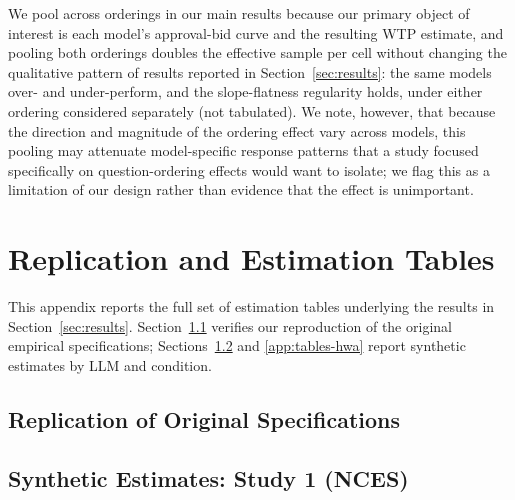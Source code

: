 \documentclass[12pt]{article}
\begin{document}
We pool across orderings in our main results because our primary object of interest is each model's approval-bid curve and the resulting WTP estimate, and pooling both orderings doubles the effective sample per cell without changing the qualitative pattern of results reported in Section~\ref{sec:results}: the same models over- and under-perform, and the slope-flatness regularity holds, under either ordering considered separately (not tabulated). We note, however, that because the direction and magnitude of the ordering effect vary across models, this pooling may attenuate model-specific response patterns that a study focused specifically on question-ordering effects would want to isolate; we flag this as a limitation of our design rather than evidence that the effect is unimportant.

\section{Replication and Estimation Tables}\label{app:tables}

This appendix reports the full set of estimation tables underlying the
results in Section~\ref{sec:results}. Section~\ref{app:replication}
verifies our reproduction of the original empirical specifications;
Sections~\ref{app:tables-nces} and \ref{app:tables-hwa} report synthetic
estimates by LLM and condition.

\subsection{Replication of Original Specifications}\label{app:replication}

\label{tab:repl-logit-Study1}

\label{tab:repl-clogit-Study2}

\newpage
\newpage

\subsection{Synthetic Estimates: Study 1 (NCES)}\label{app:tables-nces}



\label{tab:full-results}

\end{document}
